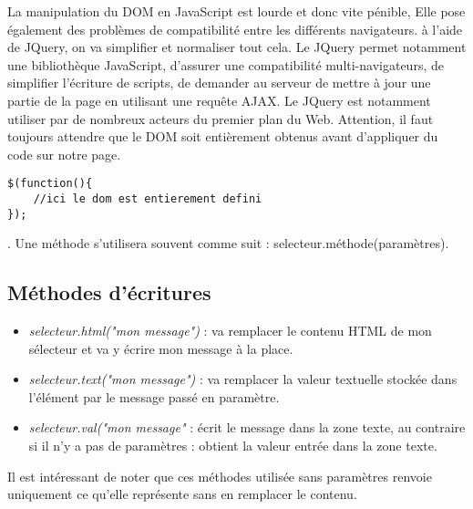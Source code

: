 \documentclass{article}[12pt]
\begin{document}
La manipulation du DOM en JavaScript est lourde et donc vite pénible, Elle pose également des problèmes de compatibilité entre les différents navigateurs. à l'aide de JQuery, on va simplifier et normaliser tout cela.
\newline
\newline
Le JQuery permet notamment une bibliothèque JavaScript, d'assurer une compatibilité multi-navigateurs, de simplifier l'écriture de scripts, de demander au serveur de mettre à jour une partie de la page en utilisant une requête AJAX. Le JQuery est notamment utiliser par de nombreux acteurs du premier plan du Web.
\newline
\newline
Attention, il faut toujours attendre que le DOM soit entièrement obtenus avant d'appliquer du code sur notre page. \begin{lstlisting}
$(function(){
	//ici le dom est entierement defini
});
\end{lstlisting}. Une méthode s'utilisera souvent comme suit : selecteur.méthode(paramètres).

\subsection{Méthodes d'écritures}
\begin{itemize}
	\item \emph{selecteur.html("mon message")} : va remplacer le contenu HTML de mon sélecteur et va y écrire mon message à la place.
    \item \emph{selecteur.text("mon message")} : va remplacer la valeur textuelle stockée dans l'élément par le message passé en paramètre.
    \item \emph{selecteur.val("mon message"} : écrit le message dans la zone texte, au contraire si il n'y a pas de paramètres : obtient la valeur entrée dans la zone texte. 
\end{itemize}
Il est intéressant de noter que ces méthodes utilisée sans paramètres renvoie uniquement ce qu'elle représente sans en remplacer le contenu.
\end{document}
